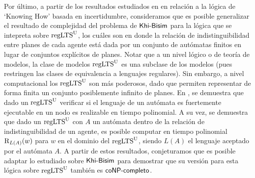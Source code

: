 Por último, a partir de los resultados estudiados en \cite{Demri_Fervari_2023} en relación a la lógica de `Knowing How' basada en incertidumbre, 
consideramos que es posible generalizar el resultado de complejidad del problema de $\rm\textsf{Khi-Bisim}$ para la lógica que se intepreta sobre $\rm{regLTS}^U$, los 
cuáles son \ults en donde la relación de indistinguibilidad entre planes de cada agente está dada por un conjunto de autómatas finitos en lugar 
de conjuntos explícitos de planes. 
Notar que a un nivel lógico o de teoría de modelos, la clase de modelos $\rm{regLTS}^U$ es una subclase de los modelos \ults (pues restringen las clases de equivalencia 
a lenguajes regulares). Sin embargo, a nivel computacional los $\rm{regLTS}^U$ son más poderosos, dado que permiten representar de forma finita un conjunto 
posiblemente infinito de planes. En \cite{Demri_Fervari_2023}, se demuestra que dado un $\rm{regLTS}^U$ verificar si el lenguaje de un autómata 
es fuertemente ejecutable en un nodo es realizable en tiempo polinomial. A su vez, se demuestra que dado un $\rm{regLTS}^U$ con $A$ un autómata dentro de la relación de indistinguibilidad de 
un agente, es posible computar en tiempo polinomial $\mathrm{R}_{L(A)}(w)$ para $w$ en el dominio del $\rm{regLTS}^U$, siendo $L(A)$ el lenguaje aceptado 
por el autómata $A$.
A partir de estos resultados, conjeturamos que es posible adaptar lo estudiado sobre $\rm\textsf{Khi-Bisim}$ para demostrar que su versión para 
esta lógica sobre $\rm{regLTS}^U$ también es $\rm\textsf{coNP-completo}$.
